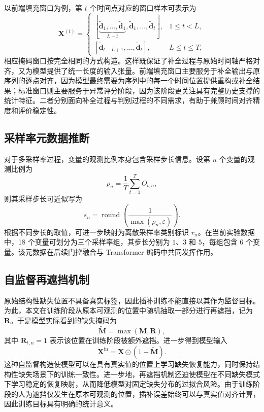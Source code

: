 以前端填充窗口为例，第 $t$ 个时间点对应的窗口样本可表示为
\begin{equation}
    \mathbf{X}^{(t)} =
    \begin{cases}
        [\underbrace{\tilde{\mathbf{d}}_1,\ldots,\tilde{\mathbf{d}}_1}_{L-t},\tilde{\mathbf{d}}_1,\ldots,\tilde{\mathbf{d}}_{t}], & 1 \leq t < L, \\
        [\tilde{\mathbf{d}}_{t-L+1},\ldots,\tilde{\mathbf{d}}_{t}], & L \leq t \leq T,
    \end{cases}
\end{equation}
相应掩码窗口按完全相同的方式构造。这样既保证了补全过程与原始时间轴严格对齐，又为模型提供了统一长度的输入张量。前端填充窗口主要服务于补全输出与原序列的逐点对齐，因为模型最终需要为序列中的每一个时间位置提供重构或补全结果；标准窗口则主要服务于异常评分阶段，因为该阶段更关注具有完整历史支撑的统计特征。二者分别面向补全过程与判别过程的不同需求，有助于兼顾时间对齐精度和评价稳定性。

\subsection{采样率元数据推断}

对于多采样率过程，变量的观测比例本身包含采样步长信息。设第 $n$ 个变量的观测比例为
\begin{equation}
    \rho_n = \frac{1}{T}\sum_{t=1}^{T} O_{t,n},
\end{equation}
则其采样步长可近似写为
\begin{equation}
    s_n = \operatorname{round}\!\left(\frac{1}{\max(\rho_n,\varepsilon)}\right).
\end{equation}
根据不同步长的取值，可进一步映射为离散采样率类别标识 $r_n$。在当前实验数据中，18 个变量可划分为三个采样率组，其步长分别为 $1$、$3$ 和 $5$，每组包含 6 个变量。该元数据在后续门控融合与 Transformer 编码中共同发挥作用。

\subsection{自监督再遮挡机制}

原始结构性缺失位置不具备真实标签，因此插补训练不能直接以其作为监督目标。为此，本文在训练阶段从原本可观测的位置中随机抽取一部分进行再遮挡，记为 $\mathbf{R}$。于是模型实际看到的缺失掩码为
\begin{equation}
    \widetilde{\mathbf{M}} = \max(\mathbf{M}, \mathbf{R}),
\end{equation}
其中 $\mathbf{R}_{t,n}=1$ 表示该位置在训练阶段被额外遮挡。进一步得到模型输入
\begin{equation}
    \mathbf{X}^{\mathrm{in}} = \mathbf{X} \odot (1-\widetilde{\mathbf{M}}).
\end{equation}
这种自监督构造使模型可以在具有真实值的位置上学习缺失恢复能力，同时保持结构性缺失场景下的训练一致性。进一步地，再遮挡机制还迫使模型在不同缺失模式下学习稳定的恢复映射，从而降低模型对固定缺失分布的过拟合风险。由于训练阶段的人为遮挡仅发生在原本可观测的位置，插补误差始终可以与真实值对齐计算，因此训练目标具有明确的统计意义。

